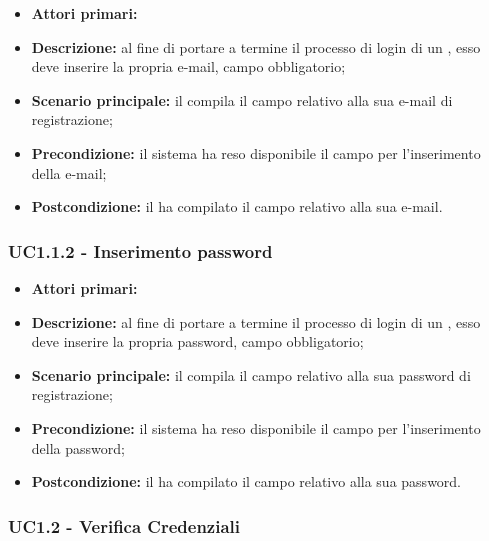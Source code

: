 \documentclass[../analisi-dei-requisiti]{subfiles}
\begin{document}
\begin{itemize}
  \item \textbf{Attori primari:} 
  \item \textbf{Descrizione:} al fine di portare a termine il processo di login di un , esso deve inserire la propria e-mail, campo obbligatorio;
  \item \textbf{Scenario principale:} il  compila il campo relativo alla sua e-mail di registrazione;
  \item \textbf{Precondizione:} il sistema ha reso disponibile il campo per l'inserimento della e-mail;
  \item \textbf{Postcondizione:} il  ha compilato il campo relativo alla sua e-mail.
\end{itemize}

\subsubsection{UC1.1.2 - Inserimento password}
\label{subsub:UC1.1.2}

\begin{itemize}
  \item \textbf{Attori primari:} 
  \item \textbf{Descrizione:} al fine di portare a termine il processo di login di un , esso deve inserire la propria password, campo obbligatorio;
  \item \textbf{Scenario principale:} il  compila il campo relativo alla sua password di registrazione;
  \item \textbf{Precondizione:} il sistema ha reso disponibile il campo per l'inserimento della password;
  \item \textbf{Postcondizione:} il  ha compilato il campo relativo alla sua password.
\end{itemize}


\subsubsection{UC1.2 - Verifica Credenziali}
\label{subsub:UC1.2}
\end{document}
